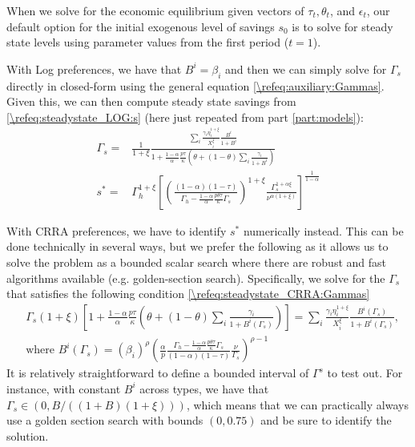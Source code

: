 \documentclass[a4paper]{article}
\begin{document}
When we solve for the economic equilibrium given vectors of $\tau_t, \theta_t$, and $\epsilon_t$, our default option for the initial exogenous level of savings $s_0$ is to solve for steady state levels using parameter values from the first period ($t=1$). 


With Log preferences, we have that $B^i = \beta_i$ and then we can simply solve for $\Gamma_{s}$ directly in closed-form using the general equation \eqref{\refeq:auxiliary:Gammas}. Given this, we can then compute steady state savings from \eqref{\refeq:steadystate_LOG:s} (here just repeated from part \ref{part:models}):
\begin{subequations}\label{\refeq:steadystate_LOG}
    \begin{align}
        \Gamma_s =& \frac{1}{1+\xi}\frac{\sum_i \frac{\gamma_{i}\eta_{i}^{1+\xi}}{X_{i}^{\xi}}\frac{B^i}{1+B^i}}{1+\frac{1-\alpha}{\alpha}\frac{p\tau}{\kappa}\left(\theta+(1-\theta)\sum_i\frac{\gamma_{i}}{1+B^i}\right)} \label{\refeq:steadystate_LOG:Gammas}\\ 
         s^* =& \Gamma_h^{1+\xi}\left[\left(\frac{(1-\alpha)(1-\tau)}{\Gamma_h-\frac{1-\alpha}{\alpha}\frac{p\theta\tau}{\kappa}\Gamma_s}\right)^{1+\xi}\frac{\Gamma_s^{1+\alpha\xi}}{\nu^{\alpha(1+\xi)}}\right]^{\frac{1}{1-\alpha}} \label{\refeq:steadystate_LOG:s}
    \end{align}
\end{subequations}

With CRRA preferences, we have to identify $s^*$ numerically instead. This can be done technically in several ways, but we prefer the following as it allows us to solve the problem as a bounded scalar search where there are robust and fast algorithms available (e.g. golden-section search). Specifically, we solve for the $\Gamma_s$ that satisfies the following condition \eqref{\refeq:steadystate_CRRA:Gammas}
\begin{subequations}\label{\refeq:steadystate_CRRA}
\begin{align}
    &\Gamma_s(1+\xi)\left[1+\frac{1-\alpha}{\alpha}\frac{p\tau}{\kappa}\left(\theta+(1-\theta)\sum_i\frac{\gamma_i}{1+B^i(\Gamma_s)}\right)\right] = \sum_i\frac{\gamma_i\eta_i^{1+\xi}}{X_i^{\xi}} \frac{B^i(\Gamma_s)}{1+B^i(\Gamma_s)}, \label{\refeq:steadystate_CRRA:Gammas} \\
    &\text{where }B^i(\Gamma_s) = \left(\beta_i\right)^{\rho} \left(\frac{\alpha}{p}\frac{\Gamma_h-\frac{1-\alpha}{\alpha}\frac{p\theta\tau}{\kappa}\Gamma_s}{(1-\alpha)(1-\tau)}\frac{\nu}{\Gamma_s}   \right)^{\rho-1} \label{\refeq:steadystate_CRRA:Bi}
\end{align}
\end{subequations}
It is relatively straightforward to define a bounded interval of $\Gamma^s$ to test out. For instance, with constant $B^i$ across types, we have that $\Gamma_s \in \left(0, B/((1+B)(1+\xi)) \right)$, which means that we can practically always use a golden section search with bounds $(0, 0.75)$ and be sure to identify the solution.
\end{document}
